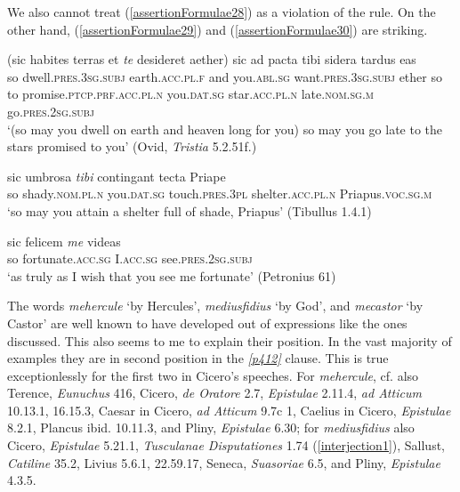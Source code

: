 We also cannot treat (\ref{assertionFormulae28}) as a violation of the rule. On the other hand, (\ref{assertionFormulae29}) and (\ref{assertionFormulae30}) are striking.

\begin{exe}
\ex
\gll (sic habites terras et \emph{te} desideret aether) sic ad pacta tibi sidera tardus eas\\
so dwell.\textsc{pres.3sg.subj} earth.\textsc{acc.pl.f} and you.\textsc{abl.sg} want.\textsc{pres.3sg.subj} ether so to promise.\textsc{ptcp.prf.acc.pl.n} you.\textsc{dat.sg} star.\textsc{acc.pl.n} late.\textsc{nom.sg.m} go.\textsc{pres.2sg.subj}\\
\trans `(so may you dwell on earth and heaven long for you) so may you go late to the stars promised to you’ (Ovid, \textit{Tristia} 5.2.51f.)
\label{assertionFormulae28}
\end{exe}

\begin{exe}
\ex
\gll sic umbrosa \emph{tibi} contingant tecta Priape\\
so shady.\textsc{nom.pl.n} you.\textsc{dat.sg} touch.\textsc{pres.3pl} shelter.\textsc{acc.pl.n} Priapus.\textsc{voc.sg.m}\\
\trans `so may you attain a shelter full of shade, Priapus’ (Tibullus 1.4.1)
\label{assertionFormulae29}
\end{exe}

\begin{exe}
\ex
\gll sic felicem \emph{me} videas\\
so fortunate.\textsc{acc.sg} I.\textsc{acc.sg} see.\textsc{pres.2sg.subj}\\
\trans `as truly as I wish that you see me fortunate’ (Petronius 61)
\label{assertionFormulae30}
\end{exe}%

The words \emph{mehercule} `by Hercules', \emph{mediusfidius} `by God', and \emph{mecastor} `by Castor' are well known to have developed out of expressions like the ones discussed. This also seems to me to explain their position. In the vast majority of examples they are in second position in the \hyperlink{p412}{\emph{[p412]}} clause. This is true exceptionlessly for the first two in Cicero's speeches. For \emph{mehercule}, cf. also Terence, \textit{Eunuchus} 416, Cicero, \textit{de Oratore} 2.7, \textit{Epistulae} 2.11.4, \textit{ad Atticum} 10.13.1, 16.15.3, Caesar in Cicero, \textit{ad Atticum} 9.7c 1, Caelius in Cicero, \textit{Epistulae} 8.2.1, Plancus ibid. 10.11.3, and Pliny, \textit{Epistulae} 6.30; for \emph{mediusfidius} also Cicero, \textit{Epistulae} 5.21.1, \textit{Tusculanae Disputationes} 1.74 (\ref{interjection1}), Sallust, \textit{Catiline} 35.2, Livius 5.6.1, 22.59.17, Seneca, \textit{Suasoriae} 6.5, and Pliny, \textit{Epistulae} 4.3.5.


